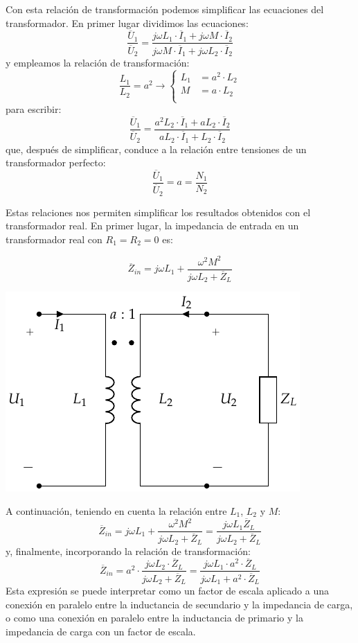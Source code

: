 Con esta relación de transformación podemos simplificar las ecuaciones del transformador. En primer lugar dividimos las ecuaciones:
\[
  \frac{\overline{U}_1}{\overline{U}_2} = \frac{j \omega L_1 \cdot \overline{I}_1 + j \omega M \cdot \overline{I}_2}{j \omega M \cdot \overline{I}_1 + j \omega L_2 \cdot \overline{I}_2}
\]
y empleamos la relación de transformación:
\[
  \frac{L_1}{L_2} = a^2
  \rightarrow
  \left\{
  \begin{array}{ll}
    L_1 &= a^2 \cdot L_2\\
    M &= a \cdot L_2\\
  \end{array}\right.
\]
para escribir:
\[
  \frac{\overline{U}_1}{\overline{U}_2} = \frac{a^2 L_2 \cdot \overline{I}_1 + a L_2 \cdot \overline{I}_2}{a L_2 \cdot \overline{I}_1 + L_2 \cdot \overline{I}_2}
\]
que, después de simplificar, conduce a la relación entre tensiones de un transformador perfecto:
\begin{equation}
  \label{eq:trafo-perfecto-tensiones}
  \boxed{\frac{\overline{U}_1}{\overline{U}_2} = a = \frac{N_1}{N_2}}
\end{equation}

Estas relaciones nos permiten simplificar los resultados obtenidos con el transformador real. En primer lugar, la impedancia de entrada en un transformador real con $R_1 = R_2 = 0$ es:

\[
  \overline{Z}_{in} = j\omega L_1 + \frac{\omega^2 M^2}{j\omega L_2 + \overline{Z}_L}
\]

\includegraphics[height=0.2\textheight]{../figs/TrafoPerfecto_ImpedanciaSecundario.pdf}


A continuación, teniendo en cuenta la relación entre $L_1$, $L_2$ y $M$:
\[
  \overline{Z}_{in} = j\omega L_1 + \frac{\omega^2 M^2}{j\omega L_2 + \overline{Z}_L} = \frac{j\omega L_1 \overline{Z}_L}{j\omega L_2 + \overline{Z}_L}
\]
y, finalmente, incorporando la relación de transformación:
\begin{equation}
  \label{eq:trafo-perfecto-impedancia-entrada}
  \overline{Z}_{in} =  a^2 \cdot \frac{j \omega L_2 \cdot \overline{Z}_L}{j\omega L_2 + \overline{Z}_L} =  \frac{j \omega L_1 \cdot a^2 \cdot \overline{Z}_L}{j\omega L_1 + a^2 \cdot \overline{Z}_L}
\end{equation}
Esta expresión se puede interpretar como un factor de escala aplicado a una conexión en paralelo entre la inductancia de secundario y la impedancia de carga, o como una conexión en paralelo entre la inductancia de primario y la impedancia de carga con un factor de escala.

